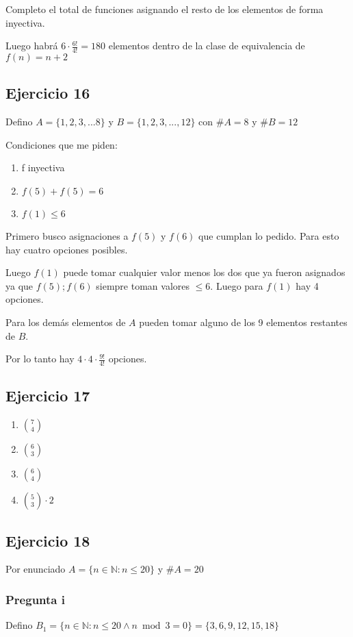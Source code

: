 Completo el total de funciones asignando el resto de los elementos de forma inyectiva.

Luego habrá $ 6 \cdot \frac{6!}{4!} = 180$ elementos dentro de la clase de equivalencia de $f(n) = n+2$

\subsection{Ejercicio 16}

Defino $A=\{ 1,2,3,...8 \}$ y $B=\{ 1,2,3,...,12 \}$ con $\#A = 8$ y $ \#B = 12 $

Condiciones que me piden:
\begin{enumerate}
    \item f inyectiva
    \item $f(5) + f(5) = 6$
    \item $ f(1) \leq 6 $
\end{enumerate}

Primero busco asignaciones a $f(5)$ y $f(6)$ que cumplan lo pedido. Para esto hay cuatro opciones posibles.

Luego $f(1)$ puede tomar cualquier valor menos los dos que ya fueron asignados ya que $f(5); f(6)$ siempre toman valores $\leq 6$. Luego para $f(1)$ hay 4 opciones.

Para los demás elementos de $A$ pueden tomar alguno de los 9 elementos restantes de $B$.

Por lo tanto hay $4 \cdot 4 \cdot \frac{9!}{4!} $ opciones.

\subsection{Ejercicio 17}
\begin{enumerate}
    \item $\binom{7}{4}$
    \item $\binom{6}{3}$
    \item $\binom{6}{4}$
    \item $\binom{5}{3} \cdot 2$
\end{enumerate}

\subsection{Ejercicio 18}
Por enunciado $A = \{ n \in \mathbb{N}: n \leq 20 \}$ y $\#A = 20$

\subsubsection{Pregunta i}
Defino $B_1 = \{ n \in \mathbb{N}: n \leq 20 \wedge n \bmod 3 = 0 \} = \{ 3,6,9,12,15,18 \}$

